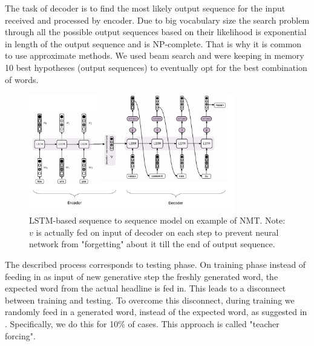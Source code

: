 The task of decoder is to find the most likely output sequence for the input received and processed by encoder. Due to big vocabulary size the search problem through all the possible output sequences based on their likelihood is exponential in length of the output sequence and is NP-complete. That is why it is common to use approximate methods. We used beam search and were keeping in memory 10 best hypotheses (output sequences) to eventually opt for the best combination of words. 


\begin{figure}[h]
\centering
	\includegraphics[width=0.8\textwidth]{img/seq2seq-detailed.png}
	\caption{\label{fig:encoder}LSTM-based sequence to sequence model on example of NMT. Note: $v$ is actually fed on input of decoder on each step to prevent neural network from "forgetting" about it till the end of output sequence. }
\end{figure}

The described process corresponds to testing phase. On training phase instead of feeding in as input of new generative step the freshly generated word, the expected word from the actual headline is fed in. This leads to a disconnect between training
and testing. To overcome this disconnect, during training we randomly feed in a generated word,
instead of the expected word, as suggested in \cite{scheduled_sampling}. Specifically, we do this for 10\% of cases. This approach is called "teacher forcing".


